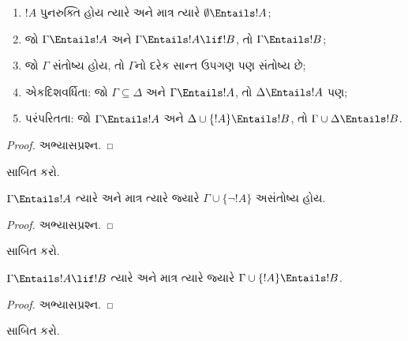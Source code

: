 \begin{prop}
\begin{enumerate}
\item $!A$ પુનરુક્તિ હોય ત્યારે અને માત્ર ત્યારે
  $\emptyset \Entails !A$;
\item જો $\Gamma \Entails !A$ અને $\Gamma \Entails !A \lif !B$, તો
  $\Gamma \Entails !B$;
\item જો $\Gamma$ સંતોષ્ય હોય, તો $\Gamma$નો દરેક સાન્ત ઉપગણ પણ
  સંતોષ્ય છે;
\item {} એકદિશવર્ધિતા: જો
  $\Gamma \subseteq \Delta$ અને $\Gamma \Entails !A$, તો
  $\Delta \Entails !A$ પણ;
\item {} પરંપરિતતા: જો $\Gamma \Entails !A$ અને
  $\Delta \cup \{ !A\} \Entails !B$, તો $\Gamma \cup \Delta \Entails
  !B$.
\end{enumerate}
\end{prop}

\begin{proof}
અભ્યાસપ્રશ્ન.
\end{proof}

\begin{prob}
 સાબિત કરો.
\end{prob}

\begin{prop}
  $\Gamma \Entails !A$ ત્યારે અને માત્ર ત્યારે જ્યારે
  $\Gamma \cup \{\lnot !A\}$ અસંતોષ્ય હોય.
\end{prop}

\begin{proof}
અભ્યાસપ્રશ્ન.
\end{proof}

\begin{prob}
 સાબિત કરો.
\end{prob}

\begin{thm}[અર્થાનુસારી નિગમન પ્રમેય]
   $\Gamma \Entails !A \lif !B$ ત્યારે અને માત્ર
  ત્યારે જ્યારે $\Gamma \cup \{!A\} \Entails !B$.
\end{thm}

\begin{proof}
અભ્યાસપ્રશ્ન.
\end{proof}

\begin{prob}
 સાબિત કરો.
\end{prob}
\endgroup


